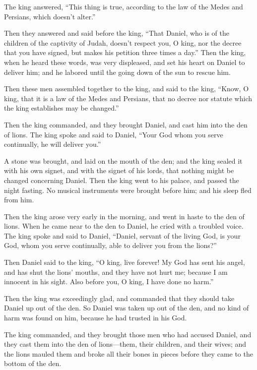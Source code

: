 The king answered, ``This thing is true, according to the law of the
Medes and Persians, which doesn't alter.''

 Then they answered and said before the king, ``That
Daniel, who is of the children of the captivity of Judah, doesn't
respect you, O king, nor the decree that you have signed, but makes his
petition three times a day.''  Then the king, when he
heard these words, was very displeased, and set his heart on Daniel to
deliver him; and he labored until the going down of the sun to rescue
him.

 Then these men assembled together to the king, and said
to the king, ``Know, O king, that it is a law of the Medes and Persians,
that no decree nor statute which the king establishes may be changed.''

 Then the king commanded, and they brought Daniel, and
cast him into the den of lions. The king spoke and said to Daniel,
``Your God whom you serve continually, he will deliver you.''

 A stone was brought, and laid on the mouth of the den;
and the king sealed it with his own signet, and with the signet of his
lords, that nothing might be changed concerning Daniel. 
Then the king went to his palace, and passed the night fasting. No
musical instruments were brought before him; and his sleep fled from
him.

 Then the king arose very early in the morning, and went
in haste to the den of lions.  When he came near to the
den to Daniel, he cried with a troubled voice. The king spoke and said
to Daniel, ``Daniel, servant of the living God, is your God, whom you
serve continually, able to deliver you from the lions?''

 Then Daniel said to the king, ``O king, live forever!
 My God has sent his angel, and has shut the lions'
mouths, and they have not hurt me; because I am innocent in his sight.
Also before you, O king, I have done no harm.''

 Then the king was exceedingly glad, and commanded that
they should take Daniel up out of the den. So Daniel was taken up out of
the den, and no kind of harm was found on him, because he had trusted in
his God.

 The king commanded, and they brought those men who had
accused Daniel, and they cast them into the den of lions---them, their
children, and their wives; and the lions mauled them and broke all their
bones in pieces before they came to the bottom of the den.


